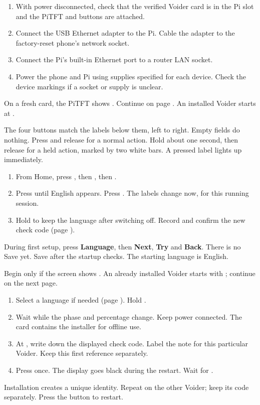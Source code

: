 \begin{enumerate}
\item With power disconnected, check that the verified Voider card is in the Pi slot and the PiTFT and buttons are attached.
\item Connect the USB Ethernet adapter to the Pi. Cable the adapter to the factory-reset phone's network socket.
\item Connect the Pi's built-in Ethernet port to a router LAN socket.
\item Power the phone and Pi using supplies specified for each device. Check the device markings if a socket or supply is unclear.
\end{enumerate}
On a fresh card, the PiTFT shows . Continue on page \pageref{en:install}. An installed Voider starts at .

The four buttons match the labels below them, left to right. Empty fields do nothing. Press and release for a normal action. Hold about one second, then release for a held action, marked by two white bars. A pressed label lights up immediately.
\begin{enumerate}
\item From Home, press , then , then .
\item Press  until English appears. Press . The labels change now, for this running session.
\item Hold  to keep the language after switching off. Record and confirm the new check code (page \pageref{en:check}).
\end{enumerate}
During first setup, press \textbf{Language}, then \textbf{Next}, \textbf{Try} and \textbf{Back}. There is no Save yet. Save after the startup checks. The starting language is English.

Begin only if the screen shows . An already installed Voider starts with ; continue on the next page.
\begin{enumerate}
\item Select a language if needed (page \pageref{en:controls}). Hold .
\item Wait while the phase and percentage change. Keep power connected. The card contains the installer for offline use.
\item At , write down the displayed check code. Label the note for this particular Voider. Keep this first reference separately.
\item Press  once. The display goes black during the restart. Wait for .
\end{enumerate}
Installation creates a unique identity. Repeat on the other Voider; keep its code separately. Press the button to restart.

